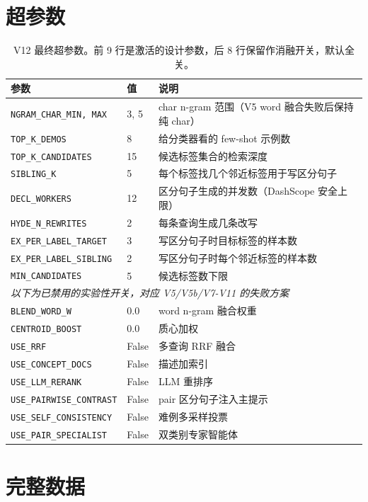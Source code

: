 \documentclass[11pt,a4paper]{article}
\begin{document}
\section{超参数}
\label{app:hyper}

\begin{table}[h]
\centering
\begin{tabular}{llp{6.5cm}}
\toprule
参数 & 值 & 说明 \\
\midrule
\texttt{NGRAM\_CHAR\_MIN, MAX} & 3, 5 & char n-gram 范围（V5 word 融合失败后保持纯 char）\\
\texttt{TOP\_K\_DEMOS} & 8 & 给分类器看的 few-shot 示例数 \\
\texttt{TOP\_K\_CANDIDATES} & 15 & 候选标签集合的检索深度 \\
\texttt{SIBLING\_K} & 5 & 每个标签找几个邻近标签用于写区分句子 \\
\texttt{DECL\_WORKERS} & 12 & 区分句子生成的并发数（DashScope 安全上限）\\
\texttt{HYDE\_N\_REWRITES} & 2 & 每条查询生成几条改写 \\
\texttt{EX\_PER\_LABEL\_TARGET} & 3 & 写区分句子时目标标签的样本数 \\
\texttt{EX\_PER\_LABEL\_SIBLING} & 2 & 写区分句子时每个邻近标签的样本数 \\
\texttt{MIN\_CANDIDATES} & 5 & 候选标签数下限 \\
\midrule
\multicolumn{3}{l}{\textit{以下为已禁用的实验性开关，对应 V5/V5b/V7-V11 的失败方案}} \\
\texttt{BLEND\_WORD\_W} & 0.0 & word n-gram 融合权重 \\
\texttt{CENTROID\_BOOST} & 0.0 & 质心加权 \\
\texttt{USE\_RRF} & False & 多查询 RRF 融合 \\
\texttt{USE\_CONCEPT\_DOCS} & False & 描述加索引 \\
\texttt{USE\_LLM\_RERANK} & False & LLM 重排序 \\
\texttt{USE\_PAIRWISE\_CONTRAST} & False & pair 区分句子注入主提示 \\
\texttt{USE\_SELF\_CONSISTENCY} & False & 难例多采样投票 \\
\texttt{USE\_PAIR\_SPECIALIST} & False & 双类别专家智能体 \\
\bottomrule
\end{tabular}
\caption{V12 最终超参数。前 9 行是激活的设计参数，后 8 行保留作消融开关，默认全关。}
\end{table}

\section{完整数据}
\label{app:data}
\end{document}
